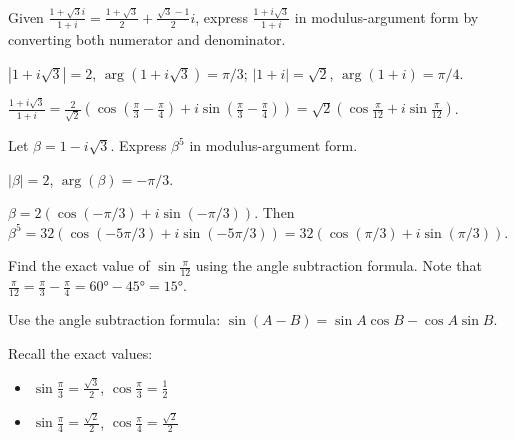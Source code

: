 \begin{problem}
Given $\frac{1+\sqrt{3}i}{1+i} = \frac{1+\sqrt{3}}{2} + \frac{\sqrt{3}-1}{2}i$, express $\frac{1+i\sqrt{3}}{1+i}$ in modulus-argument form by converting both numerator and denominator.
\end{problem}

\begin{hint}
$|1+i\sqrt{3}| = 2$, $\arg(1+i\sqrt{3}) = \pi/3$; $|1+i| = \sqrt{2}$, $\arg(1+i) = \pi/4$.
\end{hint}

\begin{solution}[Sketch]
$\frac{1+i\sqrt{3}}{1+i} = \frac{2}{\sqrt{2}}\left(\cos\left(\frac{\pi}{3}-\frac{\pi}{4}\right) + i\sin\left(\frac{\pi}{3}-\frac{\pi}{4}\right)\right) = \sqrt{2}\left(\cos\frac{\pi}{12} + i\sin\frac{\pi}{12}\right)$.
\end{solution}

\begin{problem}
Let $\beta = 1 - i\sqrt{3}$. Express $\beta^5$ in modulus-argument form.
\end{problem}

\begin{hint}
$|\beta| = 2$, $\arg(\beta) = -\pi/3$.
\end{hint}

\begin{solution}[Sketch]
$\beta = 2(\cos(-\pi/3) + i\sin(-\pi/3))$. Then $\beta^5 = 32(\cos(-5\pi/3) + i\sin(-5\pi/3)) = 32(\cos(\pi/3) + i\sin(\pi/3))$.
\end{solution}

\begin{problem}
Find the exact value of $\sin \frac{\pi}{12}$ using the angle subtraction formula. Note that $\frac{\pi}{12} = \frac{\pi}{3} - \frac{\pi}{4} = 60° - 45° = 15°$.
\end{problem}

\begin{hint}
Use the angle subtraction formula: $\sin(A - B) = \sin A \cos B - \cos A \sin B$.

Recall the exact values:
\begin{itemize}
\item $\sin \frac{\pi}{3} = \frac{\sqrt{3}}{2}$, $\cos \frac{\pi}{3} = \frac{1}{2}$
\item $\sin \frac{\pi}{4} = \frac{\sqrt{2}}{2}$, $\cos \frac{\pi}{4} = \frac{\sqrt{2}}{2}$
\end{itemize}
\end{hint}

